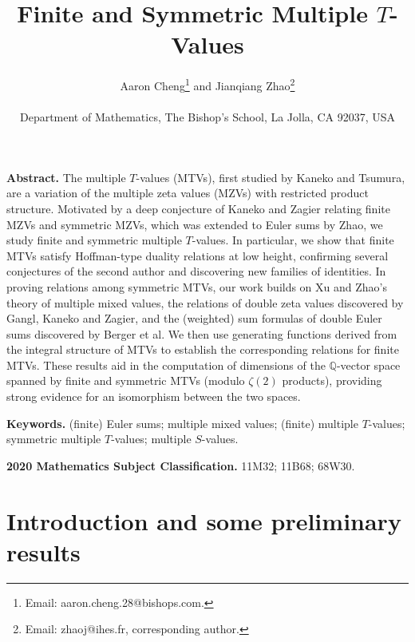 \documentclass{article}
\newcommand{\Q}{\mathbb{Q}}
\theoremstyle{plain}
\theoremstyle{definition}
\begin{document}
\title{Finite and Symmetric Multiple $T$-Values}

\author{Aaron Cheng\footnote{Email: aaron.cheng.28@bishops.com.} and Jianqiang Zhao\footnote{Email: zhaoj@ihes.fr, corresponding author.}\\
\ \\
Department of Mathematics, The Bishop's School, La Jolla, CA 92037, USA}

\date{}

\maketitle

\medskip
\noindent
\textbf{Abstract.}
The multiple $T$-values (MTVs), first studied by Kaneko and Tsumura, are a variation of the multiple zeta values (MZVs) with restricted product structure. Motivated by a deep conjecture of Kaneko and Zagier relating finite MZVs and symmetric MZVs, which was extended to Euler sums by Zhao, we study finite and symmetric multiple $T$-values. In particular, we show that finite MTVs satisfy Hoffman-type duality relations at low height, confirming several conjectures of the second author and discovering new families of identities. In proving relations among symmetric MTVs, our work builds on Xu and Zhao's theory of multiple mixed values, the relations of double zeta values discovered by Gangl, Kaneko and Zagier, and the (weighted) sum formulas of double Euler sums discovered by Berger et al. We then use generating functions derived from the integral structure of MTVs to establish the corresponding relations for finite MTVs. These results aid in the computation of dimensions of the $\Q$-vector space spanned by finite and symmetric MTVs (modulo $\zeta(2)$ products), providing strong evidence for an isomorphism between the two spaces.


\medskip
\noindent
\textbf{Keywords.}
(finite) Euler sums; multiple mixed values; (finite) multiple $T$-values; symmetric multiple $T$-values; multiple $S$-values.

\medskip
\noindent
\textbf{2020 Mathematics Subject Classification.} 11M32; 11B68; 68W30.


\section{Introduction and some preliminary results}
\end{document}
